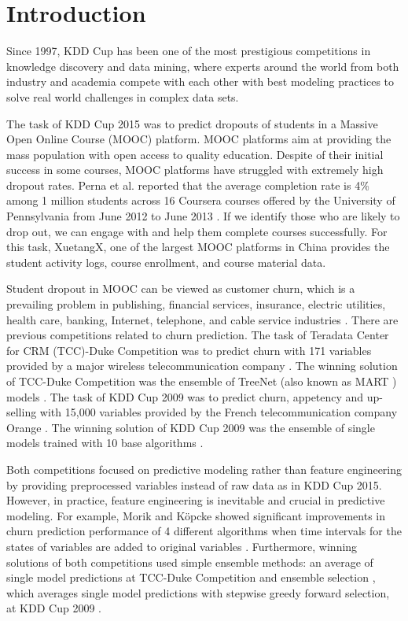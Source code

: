\section{Introduction}
Since 1997, KDD Cup has been one of the most prestigious competitions in knowledge discovery and data mining, where experts around the world from both industry and academia compete with each other with best modeling practices to solve real world challenges in complex data sets.

The task of KDD Cup 2015 was to predict dropouts of students in a Massive Open Online Course (MOOC) platform.  MOOC platforms aim at providing the mass population with open access to quality education.  Despite of their initial success in some courses, MOOC platforms have struggled with extremely high dropout rates. Perna et al. reported that the average completion rate is 4\% among 1 million students across 16 Coursera courses offered by the University of Pennsylvania from June 2012 to June 2013 \cite{perna2013life}.  If we identify those who are likely to drop out, we can engage with and help them complete courses successfully.  For this task, XuetangX, one of the largest MOOC platforms in China provides the student activity logs, course enrollment, and course material data.

Student dropout in MOOC can be viewed as customer churn, which is a prevailing problem in publishing, financial services, insurance, electric utilities, health care, banking, Internet, telephone, and cable service industries \cite{neslin2006defection}.  There are previous competitions related to churn prediction.  The task of Teradata Center for CRM (TCC)-Duke Competition was to predict churn with 171 variables provided by a major wireless telecommunication company \cite{neslin2006defection}. The winning solution of TCC-Duke Competition was the ensemble of TreeNet (also known as MART \cite{friedman2003multiple}) models \cite{tcc_duke_competition}.  The task of KDD Cup 2009 was to predict churn, appetency and up-selling with 15,000 variables provided by the French telecommunication company Orange \cite{guyon2009analysis}.  The winning solution of KDD Cup 2009 was the ensemble of single models trained with 10 base algorithms \cite{niculescu2009winning}.  

Both competitions focused on predictive modeling rather than feature engineering by providing preprocessed variables instead of raw data as in KDD Cup 2015. However, in practice, feature engineering is inevitable and crucial in predictive modeling.  For example, Morik and K{\"o}pcke showed significant improvements in churn prediction performance of 4 different algorithms when time intervals for the states of variables are added to original variables \cite{morik2004analysing}.  Furthermore, winning solutions of both competitions used simple ensemble methods:  an average of single model predictions at TCC-Duke Competition \cite{tcc_duke_competition} and ensemble selection \cite{caruana2004ensemble}, which averages single model predictions with stepwise greedy forward selection, at KDD Cup 2009 \cite{niculescu2009winning}.

